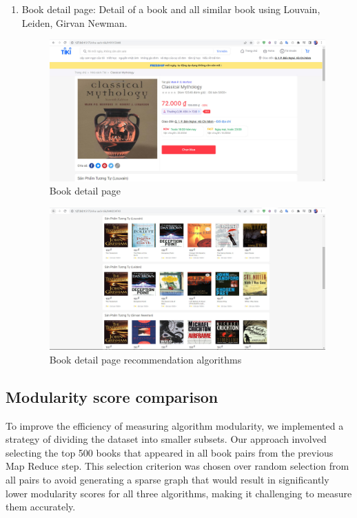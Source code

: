 \begin{enumerate}
    \item Book detail page: Detail of a book and all similar book using Louvain, Leiden, Girvan Newman.
    \begin{figure}[H]
            \centering
            \includegraphics[width=\textwidth]{image/book-detail.jpg}
            \caption{Book detail page}
        \end{figure}

    \begin{figure}[H]
            \centering
            \includegraphics[width=\textwidth]{image/book-detail2.jpg}
            \caption{Book detail page recommendation algorithms}
        \end{figure}
\end{enumerate}

\subsection{Modularity score comparison}
To improve the efficiency of measuring algorithm modularity, we implemented a strategy of dividing the dataset into smaller subsets. Our approach involved selecting the top 500 books that appeared in all book pairs from the previous Map Reduce step. This selection criterion was chosen over random selection from all pairs to avoid generating a sparse graph that would result in significantly lower modularity scores for all three algorithms, making it challenging to measure them accurately.

